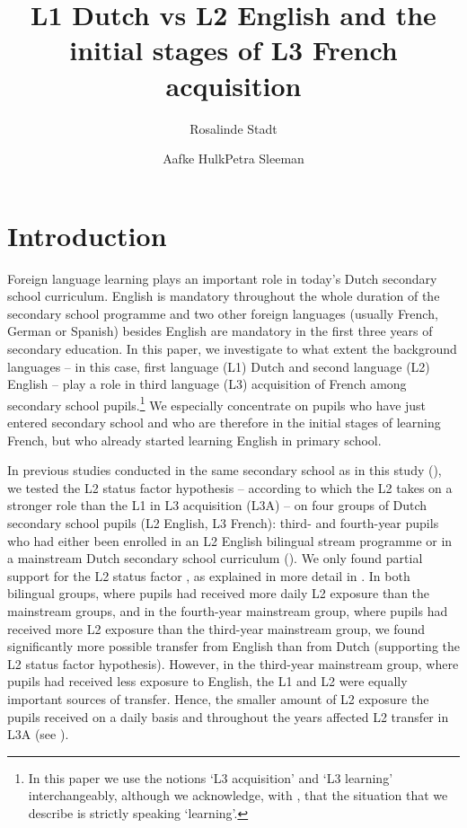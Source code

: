 \documentclass[output=paper,modfonts,nonflat, newtxmath]{langsci/langscibook}
\author{Rosalinde Stadt\affiliation{University of Amsterdam}\and Aafke Hulk\affiliation{University of Amsterdam}\lastand Petra Sleeman\affiliation{University of Amsterdam}}
\title{{L1} {Dutch} {vs} {L2} {English} {and} {the} {initial} {stages} {of} {L3} {French} {acquisition} }
\begin{document}
\maketitle


\section{Introduction}%
\label{sec:stadt:1}

Foreign language learning plays an important role in today's Dutch secondary school curriculum. English is mandatory throughout the whole duration of the secondary school programme and two other foreign languages (usually French, German or Spanish) besides English are mandatory in the first three years of secondary education. In this paper, we investigate to what extent the background languages – in this case, first language (L1) Dutch and second language (L2) English – play a role in third language (L3) acquisition of French among secondary school pupils.\footnote{ \textrm{In this paper we use the notions ‘L3 acquisition’ and ‘L3 learning’ interchangeably, although we acknowledge, with \citet[fn 1, p.61]{BardelFalk2012}, that the situation that we describe is strictly speaking ‘learning’.}} We especially concentrate on pupils who have just entered secondary school and who are therefore in the initial stages of learning French, but who already started learning English in primary school.

  In previous studies conducted in the same secondary school as in this study (\citealt{StadtEtAl2016, StadtEtAl2018Exposure}), we tested the L2 status factor hypothesis – according to which the L2 takes on a stronger role than the L1 in L3 acquisition (L3A) – on four groups of Dutch secondary school pupils (L2 English, L3 French): third- and fourth-year pupils who had either been enrolled in an L2 English bilingual stream programme or in a mainstream Dutch secondary school curriculum (\citealt{StadtEtAl2016, StadtEtAl2018Exposure}). We only found partial support for the L2 status factor \citep{BardelFalk2007, FalkBardel2011}, as explained in more detail in . In both bilingual groups, where pupils had received more daily L2 exposure than the mainstream groups, and in the fourth-year mainstream group, where pupils had received more L2 exposure than the third-year mainstream group, we found significantly more possible transfer from English than from Dutch (supporting the L2 status factor hypothesis). However, in the third-year mainstream group, where pupils had received less exposure to English, the L1 and L2 were equally important sources of transfer. Hence, the smaller amount of L2 exposure the pupils received on a daily basis and throughout the years affected L2 transfer in L3A (see \citealt{Hammarberg2001, Hammarberg2009, Tremblay2006}).
\end{document}
